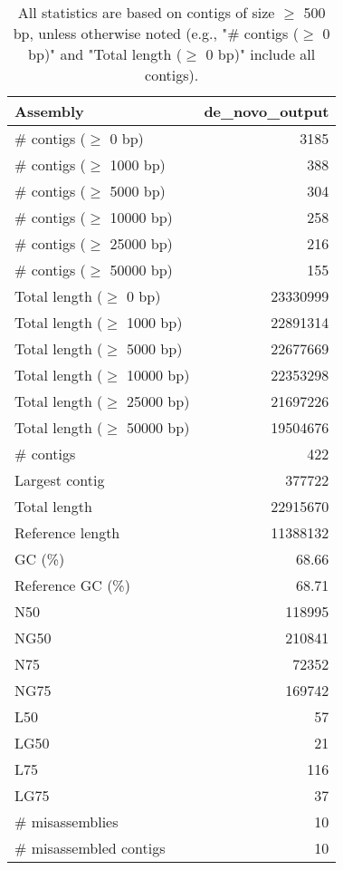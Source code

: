 \documentclass[a4paper]{article}
\begin{document}
\begin{table}[ht]
\begin{center}
\caption{All statistics are based on contigs of size $\geq$ 500 bp, unless otherwise noted (e.g., "\# contigs ($\geq$ 0 bp)" and "Total length ($\geq$ 0 bp)" include all contigs).
\label{fig:table1}
}
\begin{tabular}{|l*{1}{|r}|}
\hline
Assembly & de\_novo\_output \\ \hline
\# contigs ($\geq$ 0 bp) & 3185 \\ \hline
\# contigs ($\geq$ 1000 bp) & 388 \\ \hline
\# contigs ($\geq$ 5000 bp) & 304 \\ \hline
\# contigs ($\geq$ 10000 bp) & 258 \\ \hline
\# contigs ($\geq$ 25000 bp) &  216\\ \hline
\# contigs ($\geq$ 50000 bp) & 155 \\ \hline
Total length ($\geq$ 0 bp) & 23330999 \\ \hline
Total length ($\geq$ 1000 bp) & 22891314  \\ \hline
Total length ($\geq$ 5000 bp) & 22677669 \\ \hline
Total length ($\geq$ 10000 bp) & 22353298 \\ \hline
Total length ($\geq$ 25000 bp) & 21697226 \\ \hline
Total length ($\geq$ 50000 bp) & 19504676\\ \hline
\# contigs & 422 \\ \hline
Largest contig & 377722 \\ \hline
Total length  & 22915670 \\ \hline
Reference length & 11388132 \\ \hline
GC (\%) & 68.66 \\ \hline
Reference GC (\%) & 68.71 \\ \hline
N50 & 118995  \\ \hline
NG50 & 210841 \\ \hline
N75  & 72352  \\ \hline
NG75 & 169742 \\ \hline
L50 & 57 \\ \hline
LG50 & 21 \\ \hline
L75 & 116 \\ \hline
LG75 & 37 \\ \hline
\# misassemblies & 10 \\ \hline
\# misassembled contigs & 10 \\ \hline

\end{tabular}
\end{center}
\end{table}
\end{document}
